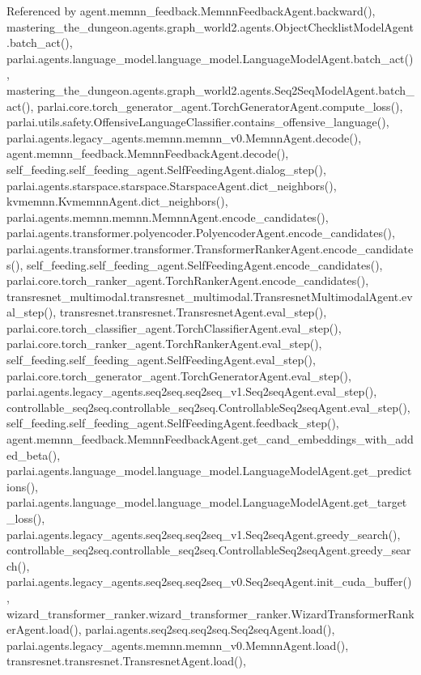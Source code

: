 Referenced by agent.\+memnn\+\_\+feedback.\+Memnn\+Feedback\+Agent.\+backward(), mastering\+\_\+the\+\_\+dungeon.\+agents.\+graph\+\_\+world2.\+agents.\+Object\+Checklist\+Model\+Agent.\+batch\+\_\+act(), parlai.\+agents.\+language\+\_\+model.\+language\+\_\+model.\+Language\+Model\+Agent.\+batch\+\_\+act(), mastering\+\_\+the\+\_\+dungeon.\+agents.\+graph\+\_\+world2.\+agents.\+Seq2\+Seq\+Model\+Agent.\+batch\+\_\+act(), parlai.\+core.\+torch\+\_\+generator\+\_\+agent.\+Torch\+Generator\+Agent.\+compute\+\_\+loss(), parlai.\+utils.\+safety.\+Offensive\+Language\+Classifier.\+contains\+\_\+offensive\+\_\+language(), parlai.\+agents.\+legacy\+\_\+agents.\+memnn.\+memnn\+\_\+v0.\+Memnn\+Agent.\+decode(), agent.\+memnn\+\_\+feedback.\+Memnn\+Feedback\+Agent.\+decode(), self\+\_\+feeding.\+self\+\_\+feeding\+\_\+agent.\+Self\+Feeding\+Agent.\+dialog\+\_\+step(), parlai.\+agents.\+starspace.\+starspace.\+Starspace\+Agent.\+dict\+\_\+neighbors(), kvmemnn.\+Kvmemnn\+Agent.\+dict\+\_\+neighbors(), parlai.\+agents.\+memnn.\+memnn.\+Memnn\+Agent.\+encode\+\_\+candidates(), parlai.\+agents.\+transformer.\+polyencoder.\+Polyencoder\+Agent.\+encode\+\_\+candidates(), parlai.\+agents.\+transformer.\+transformer.\+Transformer\+Ranker\+Agent.\+encode\+\_\+candidates(), self\+\_\+feeding.\+self\+\_\+feeding\+\_\+agent.\+Self\+Feeding\+Agent.\+encode\+\_\+candidates(), parlai.\+core.\+torch\+\_\+ranker\+\_\+agent.\+Torch\+Ranker\+Agent.\+encode\+\_\+candidates(), transresnet\+\_\+multimodal.\+transresnet\+\_\+multimodal.\+Transresnet\+Multimodal\+Agent.\+eval\+\_\+step(), transresnet.\+transresnet.\+Transresnet\+Agent.\+eval\+\_\+step(), parlai.\+core.\+torch\+\_\+classifier\+\_\+agent.\+Torch\+Classifier\+Agent.\+eval\+\_\+step(), parlai.\+core.\+torch\+\_\+ranker\+\_\+agent.\+Torch\+Ranker\+Agent.\+eval\+\_\+step(), self\+\_\+feeding.\+self\+\_\+feeding\+\_\+agent.\+Self\+Feeding\+Agent.\+eval\+\_\+step(), parlai.\+core.\+torch\+\_\+generator\+\_\+agent.\+Torch\+Generator\+Agent.\+eval\+\_\+step(), parlai.\+agents.\+legacy\+\_\+agents.\+seq2seq.\+seq2seq\+\_\+v1.\+Seq2seq\+Agent.\+eval\+\_\+step(), controllable\+\_\+seq2seq.\+controllable\+\_\+seq2seq.\+Controllable\+Seq2seq\+Agent.\+eval\+\_\+step(), self\+\_\+feeding.\+self\+\_\+feeding\+\_\+agent.\+Self\+Feeding\+Agent.\+feedback\+\_\+step(), agent.\+memnn\+\_\+feedback.\+Memnn\+Feedback\+Agent.\+get\+\_\+cand\+\_\+embeddings\+\_\+with\+\_\+added\+\_\+beta(), parlai.\+agents.\+language\+\_\+model.\+language\+\_\+model.\+Language\+Model\+Agent.\+get\+\_\+predictions(), parlai.\+agents.\+language\+\_\+model.\+language\+\_\+model.\+Language\+Model\+Agent.\+get\+\_\+target\+\_\+loss(), parlai.\+agents.\+legacy\+\_\+agents.\+seq2seq.\+seq2seq\+\_\+v1.\+Seq2seq\+Agent.\+greedy\+\_\+search(), controllable\+\_\+seq2seq.\+controllable\+\_\+seq2seq.\+Controllable\+Seq2seq\+Agent.\+greedy\+\_\+search(), parlai.\+agents.\+legacy\+\_\+agents.\+seq2seq.\+seq2seq\+\_\+v0.\+Seq2seq\+Agent.\+init\+\_\+cuda\+\_\+buffer(), wizard\+\_\+transformer\+\_\+ranker.\+wizard\+\_\+transformer\+\_\+ranker.\+Wizard\+Transformer\+Ranker\+Agent.\+load(), parlai.\+agents.\+seq2seq.\+seq2seq.\+Seq2seq\+Agent.\+load(), parlai.\+agents.\+legacy\+\_\+agents.\+memnn.\+memnn\+\_\+v0.\+Memnn\+Agent.\+load(), transresnet.\+transresnet.\+Transresnet\+Agent.\+load(), 